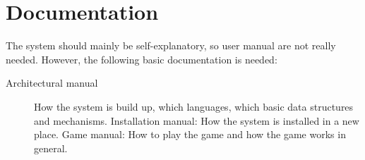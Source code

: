 \documentclass[12pt,a4paper]{article}
\begin{document}
\section{Documentation}

The system should mainly be self-explanatory, so user manual are not
really needed. However, the following basic documentation is needed:

\begin{description}
\item[Architectural manual] How the system is build up, which languages,
which basic data structures and mechanisms.  Installation manual: How
the system is installed in a new place.  Game manual: How to play the
game and how the game works in general.
\end{description}
\end{document}
